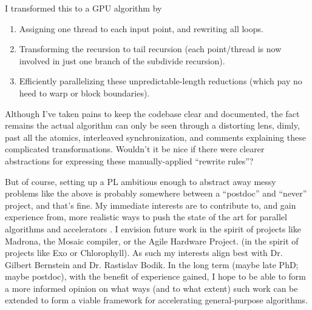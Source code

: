 I transformed this to a GPU algorithm by
\begin{enumerate}
  \item Assigning one thread to each input point, and rewriting all
  loops.

  \item Transforming the recursion to tail recursion (each
  point/thread is now involved in just one branch of the subdivide
  recursion).

  \item Efficiently parallelizing these unpredictable-length
  reductions (which pay no heed to warp or block boundaries).
\end{enumerate}

Although I've taken pains to keep the codebase clear and documented,
the fact remains the actual algorithm can only be seen through a
distorting lens, dimly, past all the atomics, interleaved
synchronization, and comments explaining these complicated
transformations. Wouldn't it be nice if there were clearer
abstractions for expressing these manually-applied ``rewrite rules''?


But of course, setting up a PL ambitious enough to abstract away messy
problems like the above is probably somewhere between a ``postdoc''
and ``never'' project, and that's fine. My immediate interests are to
contribute to, and gain experience from, more realistic ways to push
the state of the art for parallel algorithms and accelerators%
\ifdefined\STANFORD
. I envision future work in the spirit of projects like Madrona, the
Mosaic compiler, or the Agile Hardware Project.
\fi
\ifdefined\UW
 (in the spirit of projects like Exo or Chlorophyll). As such my
interests align best with Dr. Gilbert Bernstein and Dr. Rastislav
Bodik.
\fi
In the long term (maybe late PhD; maybe postdoc), with the benefit of
experience gained, I hope to be able to form a more informed opinion
on what ways (and to what extent) such work can be extended to form a
viable framework for accelerating general-purpose algorithms.



